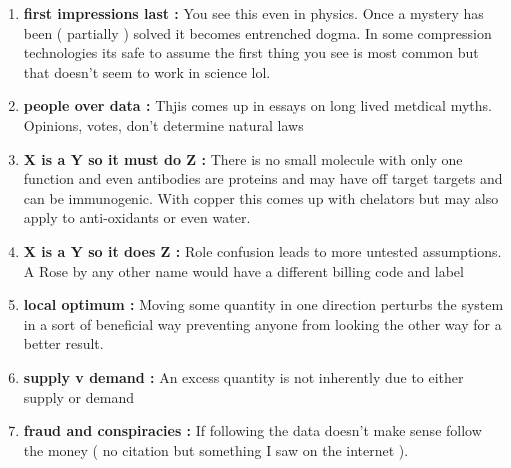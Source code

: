 \begin{mdpicomment}
\newcommand{\myitem}[2]{\item {\bf #1 : } #2 \par}
\begin{enumerate}
\myitem{first impressions last} { You see this even in physics. Once a mystery has been ( partially ) solved it becomes entrenched dogma. In some compression technologies its safe to assume the first thing you see is most common but that doesn't seem to work in science lol.  }
\myitem{people over data} { Thjis comes up in essays on long lived metdical myths. Opinions, votes, don't determine natural laws }
\myitem{X is a Y so it must do Z} {  There is no small molecule with only one function and even antibodies are proteins and may have off target targets and can be immunogenic. With copper this comes up with chelators but may also apply to anti-oxidants or even water.   }
\myitem{X is a Y so it does Z   }{ Role confusion leads to more untested assumptions. A Rose by any other name would have a different billing code and label   }
\myitem{local optimum } { Moving some quantity in one direction perturbs the system in a sort of beneficial way preventing anyone from looking the other way for a better result. }

\myitem{supply v demand}{ An excess quantity is not inherently due to either supply or demand }
\myitem{fraud and conspiracies}{ If following the data doesn't make sense follow the money ( no citation but something I saw on the internet ).  }


\end{enumerate}
\end{mdpicomment}
